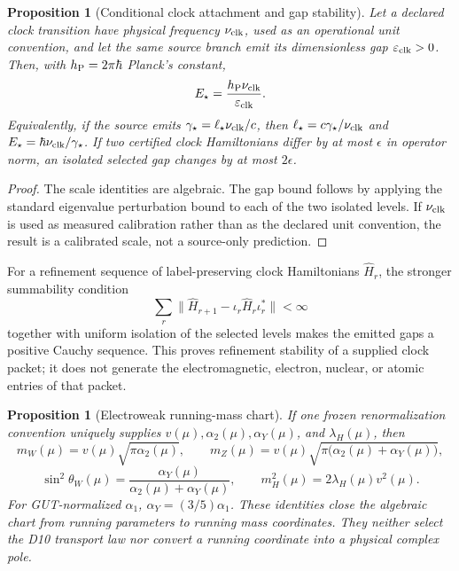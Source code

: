 \documentclass[11pt]{article}
\newtheorem{proposition}[theorem]{Proposition}
\begin{document}
\begin{proposition}[Conditional clock attachment and gap stability]
Let a declared clock transition have physical frequency \(\nu_{\rm clk}\),
used as an operational unit convention, and let the same source branch emit
its dimensionless gap \(\varepsilon_{\rm clk}>0\).  Then, with
\(h_{\rm P}=2\pi\hbar\) Planck's constant,
\[
E_\star=\frac{h_{\rm P}\nu_{\rm clk}}{\varepsilon_{\rm clk}}.
\]
Equivalently, if the source emits
\(\gamma_\star=\ell_\star\nu_{\rm clk}/c\), then
\(\ell_\star=c\gamma_\star/\nu_{\rm clk}\) and
\(E_\star=\hbar\nu_{\rm clk}/\gamma_\star\).  If two certified clock
Hamiltonians differ by at most \(\epsilon\) in operator norm, an isolated
selected gap changes by at most \(2\epsilon\).
\end{proposition}

\begin{proof}
The scale identities are algebraic.  The gap bound follows by applying the
standard eigenvalue perturbation bound to each of the two isolated levels.
If \(\nu_{\rm clk}\) is used as measured calibration rather than as the
declared unit convention, the result is a calibrated scale, not a source-only
prediction.
\end{proof}

For a refinement sequence of label-preserving clock Hamiltonians
\(\widehat H_r\), the stronger summability condition
\[
 \sum_r\|\widehat H_{r+1}-\iota_r\widehat H_r\iota_r^*\|<\infty
\]
together with uniform isolation of the selected levels makes the emitted gaps
a positive Cauchy sequence. This proves refinement stability of a supplied
clock packet; it does not generate the electromagnetic, electron, nuclear, or
atomic entries of that packet.

\begin{proposition}[Electroweak running-mass chart]
If one frozen renormalization convention uniquely supplies
\(v(\mu),\alpha_2(\mu),\alpha_Y(\mu)\), and \(\lambda_H(\mu)\), then
\[
m_W(\mu)=v(\mu)\sqrt{\pi\alpha_2(\mu)},
\qquad
m_Z(\mu)=v(\mu)\sqrt{\pi\bigl(\alpha_2(\mu)+\alpha_Y(\mu)\bigr)},
\]
\[
\sin^2\theta_W(\mu)=
\frac{\alpha_Y(\mu)}{\alpha_2(\mu)+\alpha_Y(\mu)},
\qquad
m_H^2(\mu)=2\lambda_H(\mu)v^2(\mu).
\]
For GUT-normalized \(\alpha_1\), \(\alpha_Y=(3/5)\alpha_1\).
These identities close the algebraic chart from running parameters to running
mass coordinates.  They neither select the D10 transport law nor convert a
running coordinate into a physical complex pole.
\end{proposition}
\end{document}
